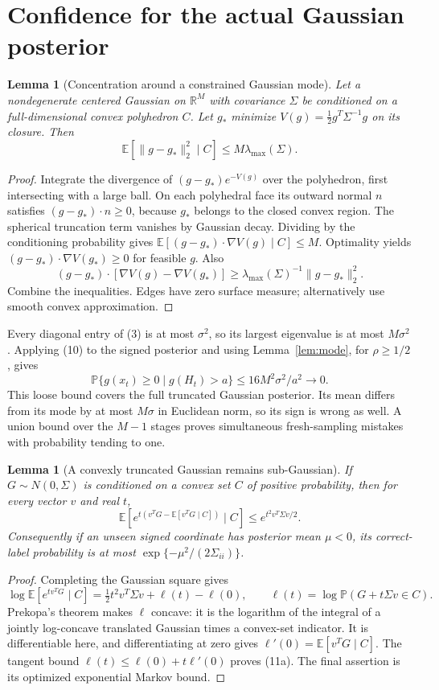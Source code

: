 \documentclass[11pt]{article}
\newtheorem{lemma}[theorem]{Lemma}
\newcommand{\R}{\mathbb R}\newcommand{\E}{\mathbb E}
\newcommand{\Pp}{\mathbb P}\newcommand{\one}{\mathbf1}
\begin{document}
\section{Confidence for the actual Gaussian posterior}
\begin{lemma}[Concentration around a constrained Gaussian mode]
Let a nondegenerate centered Gaussian on $\R^M$ with covariance
$\Sigma$ be conditioned on a full-dimensional convex polyhedron $C$.
Let $g_*$ minimize $V(g)=\frac12g^T\Sigma^{-1}g$ on its closure.
Then
\[
                 \E[\|g-g_*\|_2^2\mid C]
                                     \le M\lambda_{\max}(\Sigma). \tag{10}
\]
\end{lemma}
\begin{proof}
Integrate the divergence of $(g-g_*)e^{-V(g)}$ over the polyhedron,
first intersecting with a large ball. On each polyhedral face its
outward normal $n$ satisfies $(g-g_*)\cdot n\ge0$, because $g_*$
belongs to the closed convex region. The spherical truncation term
vanishes by Gaussian decay. Dividing by the conditioning probability gives
$\E[(g-g_*)\cdot\nabla V(g)\mid C]\le M$.
Optimality yields $(g-g_*)\cdot\nabla V(g_*)\ge0$ for feasible $g$.
Also
\[
 (g-g_*)\cdot[\nabla V(g)-\nabla V(g_*)]
       \ge\lambda_{\max}(\Sigma)^{-1}\|g-g_*\|_2^2.
\]
Combine the inequalities. Edges have zero surface measure; alternatively
use smooth convex approximation.
\end{proof}
Every diagonal entry of (3) is at most $\sigma^2$, so its largest
eigenvalue is at most $M\sigma^2$. Applying (10) to the signed posterior
and using Lemma~\ref{lem:mode}, for $\rho\ge1/2$, gives
\[
 \Pp\{g(x_t)\ge0\mid g(H_t)>a\}
                   \le16M^2\sigma^2/a^2\longrightarrow0.        \tag{11}
\]
This loose bound covers the full truncated Gaussian posterior.
Its mean differs from its mode by at most $M\sigma$ in Euclidean norm,
so its sign is wrong as well. A union bound over the $M-1$ stages proves
simultaneous fresh-sampling mistakes with probability tending to one.

\begin{lemma}[A convexly truncated Gaussian remains sub-Gaussian]
\label{lem:subgaussian}
If $G\sim N(0,\Sigma)$ is conditioned on a convex set $C$ of positive
probability, then for every vector $v$ and real $t$,
\[
 \E[e^{t(v^TG-\E[v^TG\mid C])}\mid C]
                         \le e^{t^2v^T\Sigma v/2}.            \tag{11a}
\]
Consequently if an unseen signed coordinate has posterior mean
$\mu<0$, its correct-label probability is at most
$\exp\{-\mu^2/(2\Sigma_{ii})\}$.
\end{lemma}
\begin{proof}
Completing the Gaussian square gives
\[
 \log\E[e^{tv^TG}\mid C]
   =\tfrac12t^2v^T\Sigma v+\ell(t)-\ell(0),\qquad
 \ell(t)=\log\Pp(G+t\Sigma v\in C).
\]
Prekopa's theorem \cite{prekopa} makes $\ell$ concave: it is the logarithm
of the integral of a jointly log-concave translated Gaussian times a
convex-set indicator. It is differentiable here, and differentiating
at zero gives $\ell'(0)=\E[v^TG\mid C]$.
The tangent bound $\ell(t)\le\ell(0)+t\ell'(0)$ proves (11a).
The final assertion is its optimized exponential Markov bound.
\end{proof}
\end{document}
